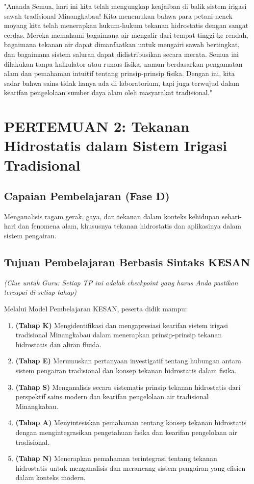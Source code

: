 \documentclass[12pt,a4paper]{article}
\begin{document}
\begin{tcolorbox}[mystyle]
"Ananda Semua, hari ini kita telah mengungkap keajaiban di balik sistem irigasi sawah tradisional Minangkabau! Kita menemukan bahwa para petani nenek moyang kita telah menerapkan hukum-hukum tekanan hidrostatis dengan sangat cerdas. Mereka memahami bagaimana air mengalir dari tempat tinggi ke rendah, bagaimana tekanan air dapat dimanfaatkan untuk mengairi sawah bertingkat, dan bagaimana sistem saluran dapat didistribusikan secara merata. Semua ini dilakukan tanpa kalkulator atau rumus fisika, namun berdasarkan pengamatan alam dan pemahaman intuitif tentang prinsip-prinsip fisika. Dengan ini, kita sadar bahwa sains tidak hanya ada di laboratorium, tapi juga terwujud dalam kearifan pengelolaan sumber daya alam oleh masyarakat tradisional."
\end{tcolorbox}

\section{PERTEMUAN 2: Tekanan Hidrostatis dalam Sistem Irigasi Tradisional}

\subsection{Capaian Pembelajaran (Fase D)}
Menganalisis ragam gerak, gaya, dan tekanan dalam konteks kehidupan sehari-hari dan fenomena alam, khususnya tekanan hidrostatis dan aplikasinya dalam sistem pengairan.

\subsection{Tujuan Pembelajaran Berbasis Sintaks KESAN}
\textit{(Clue untuk Guru: Setiap TP ini adalah checkpoint yang harus Anda pastikan tercapai di setiap tahap)}

Melalui Model Pembelajaran KESAN, peserta didik mampu:

\begin{enumerate}
\item \textbf{(Tahap K)} Mengidentifikasi dan mengapresiasi kearifan sistem irigasi tradisional Minangkabau dalam menerapkan prinsip-prinsip tekanan hidrostatis dan aliran fluida.
\item \textbf{(Tahap E)} Merumuskan pertanyaan investigatif tentang hubungan antara sistem pengairan tradisional dan konsep tekanan hidrostatis dalam fisika.
\item \textbf{(Tahap S)} Menganalisis secara sistematis prinsip tekanan hidrostatis dari perspektif sains modern dan kearifan pengelolaan air tradisional Minangkabau.
\item \textbf{(Tahap A)} Menyintesiskan pemahaman tentang konsep tekanan hidrostatis dengan mengintegrasikan pengetahuan fisika dan kearifan pengelolaan air tradisional.
\item \textbf{(Tahap N)} Menerapkan pemahaman terintegrasi tentang tekanan hidrostatis untuk menganalisis dan merancang sistem pengairan yang efisien dalam konteks modern.
\end{enumerate}
\end{document}
